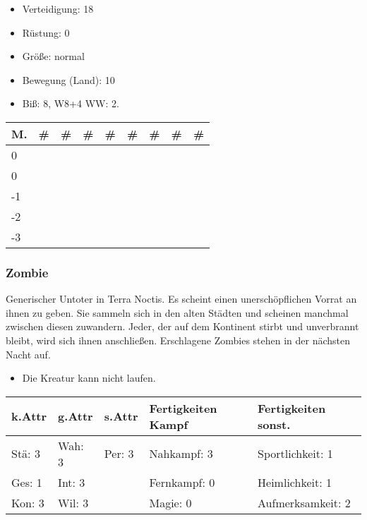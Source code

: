 \documentclass{article}
\begin{document}
\begin{itemize}
\item Verteidigung: 18
\item Rüstung:      0
\item Größe: normal
\item Bewegung (Land): 10
\item Biß: 8, W8+4 WW: 2.
\end{itemize}


\begin{small}
\begin{tabular}{|m{6mm}|m{3mm}|m{3mm}|m{3mm}|m{3mm}|m{3mm}|m{3mm}|m{3mm}|m{3mm}|}
\hline
\textbf{M.}&\textbf{\#}&\textbf{\#}&\textbf{\#}&\textbf{\#}&\textbf{\#}&\textbf{\#}&\textbf{\#}&\textbf{\#}\\
\hline
\hline
0& & & & & & & & \\
\hline
0& & & & & & & & \\
\hline
-1& & & & & & & & \\
\hline
-2& & & & & & & & \\
\hline
-3& & & & & & & & \\
\hline
\end{tabular}
\end{small}

\subsubsection{Zombie}

Generischer Untoter in Terra Noctis. Es scheint einen unerschöpflichen Vorrat an ihnen zu geben. Sie sammeln sich in
den alten Städten und scheinen manchmal zwischen diesen zuwandern. Jeder, der auf dem Kontinent stirbt und
unverbrannt bleibt, wird sich ihnen anschließen. Erschlagene Zombies stehen in der nächsten Nacht auf.
\begin{itemize}
\item Die Kreatur kann nicht laufen.
\end{itemize}


\begin{small}
\begin{tabular}{|m{15mm}|m{15mm}|m{15mm}|m{35mm}|m{35mm}|}
\hline
\textbf{k.Attr}&\textbf{g.Attr}&\textbf{s.Attr}&\textbf{Fertigkeiten Kampf}&\textbf{Fertigkeiten sonst.}\\
\hline
\hline
Stä: 3&Wah: 3&Per: 3&Nahkampf: 3&Sportlichkeit: 1\\
\hline
Ges: 1&Int: 3& &Fernkampf: 0&Heimlichkeit: 1\\
\hline
Kon: 3&Wil: 3& &Magie: 0&Aufmerksamkeit: 2\\
\hline
\end{tabular}
\end{small}
\end{document}
